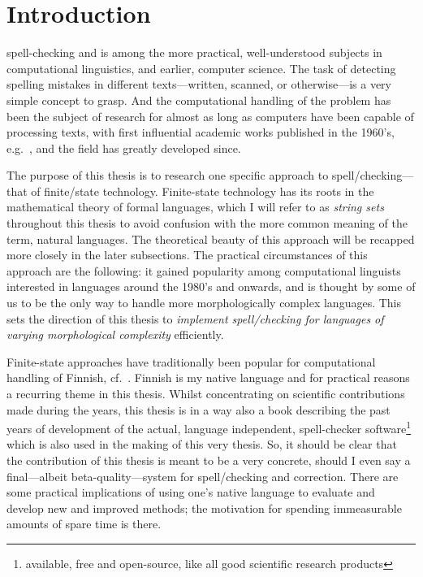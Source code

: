 \documentclass[officiallayout,final]{unihelcompling}
\begin{document}

\printglossaries

\chapter{Introduction}
\label{chap:introduction}

\Gls{spell-checking} and  is among the
more practical, well-understood subjects in \gls{computational linguistics},
and earlier, computer science.  The task of detecting spelling mistakes in
different texts---written, scanned, or otherwise---is a very simple concept to
grasp. And the computational handling of the problem has been the subject of
research for almost as long as computers have been capable of processing texts,
with first influential academic works published in the 1960's,
e.g.~\cite{damerau1964technique}, and the field has greatly developed since.

The purpose of this thesis is to research one specific approach to
spell\-/checking---that of finite\-/state technology. Finite-state technology
has its roots in the mathematical theory of \glspl{formal language}, which I
will refer to as \emph{string sets} throughout this thesis to avoid confusion
with the more common meaning of the term, \glspl{natural language}. The
theoretical beauty of this approach will be recapped more closely in the later
subsections.  The practical circumstances of this approach are the following:
it gained popularity among computational linguists interested in
 languages around the
1980's and onwards, and is thought by some of us to be the only way to handle
more morphologically complex languages. This sets the direction of this thesis
to \emph{implement spell\-/checking for languages of varying morphological
complexity} efficiently.

Finite-state approaches have traditionally been popular for computational
handling of Finnish, cf.~\citet{koskenniemi1983twolevel}. Finnish is my native
language and for practical reasons a recurring theme in this thesis. Whilst
concentrating on scientific contributions made during the years, this thesis is
in a way also a book describing the past years of development of the actual,
language independent, \gls{spell-checker} software\footnote{available, free and
open-source, like all good scientific research products} which is also used in
the making of this very thesis. So, it should be clear that the contribution of
this thesis is meant to be a very concrete, should I even say a final---albeit
beta-quality---system for spell\-/checking and correction.  There are some
practical implications of using one's native language to evaluate and develop
new and improved methods; the motivation for spending immeasurable amounts of
spare time is there.
\end{document}
